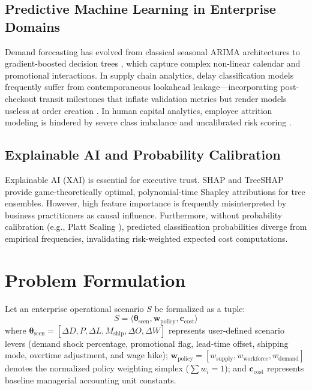 \documentclass[10pt,conference]{IEEEtran}
\begin{document}
\subsection{Predictive Machine Learning in Enterprise Domains}
Demand forecasting has evolved from classical seasonal ARIMA architectures to gradient-boosted decision trees \cite{chen2016xgboost}, which capture complex non-linear calendar and promotional interactions. In supply chain analytics, delay classification models frequently suffer from contemporaneous lookahead leakage—incorporating post-checkout transit milestones that inflate validation metrics but render models useless at order creation \cite{constante2019dataco}. In human capital analytics, employee attrition modeling is hindered by severe class imbalance and uncalibrated risk scoring \cite{guo2017calibration}.

\subsection{Explainable AI and Probability Calibration}
Explainable AI (XAI) is essential for executive trust. SHAP and TreeSHAP \cite{lundberg2017unified, lundberg2020treeshap} provide game-theoretically optimal, polynomial-time Shapley attributions for tree ensembles. However, high feature importance is frequently misinterpreted by business practitioners as causal influence. Furthermore, without probability calibration (e.g., Platt Scaling \cite{platt1999probabilistic}), predicted classification probabilities diverge from empirical frequencies, invalidating risk-weighted expected cost computations.

\section{Problem Formulation}

Let an enterprise operational scenario $S$ be formalized as a tuple:
\begin{equation}
S = \langle \mathbf{\theta}_{\text{scen}}, \mathbf{w}_{\text{policy}}, \mathbf{c}_{\text{cost}} \rangle
\end{equation}
where $\mathbf{\theta}_{\text{scen}} = [\Delta D, P, \Delta L, M_{\text{ship}}, \Delta O, \Delta W]$ represents user-defined scenario levers (demand shock percentage, promotional flag, lead-time offset, shipping mode, overtime adjustment, and wage hike); $\mathbf{w}_{\text{policy}} = [w_{\text{supply}}, w_{\text{workforce}}, w_{\text{demand}}]$ denotes the normalized policy weighting simplex ($\sum w_i = 1$); and $\mathbf{c}_{\text{cost}}$ represents baseline managerial accounting unit constants.
\end{document}

